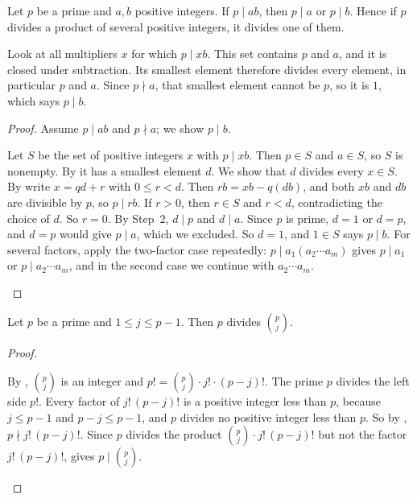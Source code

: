 \documentclass[10pt]{scrartcl}
\begin{document}
\begin{lemma*}
  Let $p$ be a prime and $a, b$ positive integers. If $p \mid ab$, then $p \mid a$ or $p \mid b$. Hence if $p$ divides a product of several positive integers, it divides one of them.
\end{lemma*}
\begin{ideabox}
  Look at all multipliers $x$ for which $p \mid xb$. This set contains $p$ and $a$, and it is closed under subtraction. Its smallest element therefore divides every element, in particular $p$ and $a$. Since $p \nmid a$, that smallest element cannot be $p$, so it is $1$, which says $p \mid b$.
\end{ideabox}
\begin{proof}
  Assume $p \mid ab$ and $p \nmid a$; we show $p \mid b$.
  \begin{steps}
    \ii Let $S$ be the set of positive integers $x$ with $p \mid xb$. Then $p \in S$ and $a \in S$, so $S$ is nonempty. By  it has a smallest element $d$.
    \ii We show that $d$ divides every $x \in S$. By  write $x = qd + r$ with $0 \le r < d$. Then $rb = xb - q(db)$, and both $xb$ and $db$ are divisible by $p$, so $p \mid rb$. If $r > 0$, then $r \in S$ and $r < d$, contradicting the choice of $d$. So $r = 0$.
    \ii By Step~2, $d \mid p$ and $d \mid a$. Since $p$ is prime, $d = 1$ or $d = p$, and $d = p$ would give $p \mid a$, which we excluded. So $d = 1$, and $1 \in S$ says $p \mid b$.
    \ii For several factors, apply the two-factor case repeatedly: $p \mid a_1(a_2\cdots a_m)$ gives $p \mid a_1$ or $p \mid a_2 \cdots a_m$, and in the second case we continue with $a_2 \cdots a_m$.
  \end{steps}
\end{proof}

\begin{lemma*}
  Let $p$ be a prime and $1 \le j \le p - 1$. Then $p$ divides $\binom pj$.
\end{lemma*}
\begin{proof}
  \begin{steps}
    \ii By , $\binom pj$ is an integer and $p! = \binom pj \cdot j! \cdot (p-j)!$. The prime $p$ divides the left side $p!$.
    \ii Every factor of $j!\,(p-j)!$ is a positive integer less than $p$, because $j \le p-1$ and $p - j \le p - 1$, and $p$ divides no positive integer less than $p$. So by , $p \nmid j!\,(p-j)!$.
    \ii Since $p$ divides the product $\binom pj \cdot j!\,(p-j)!$ but not the factor $j!\,(p-j)!$,  gives $p \mid \binom pj$.
  \end{steps}
\end{proof}
\end{document}
